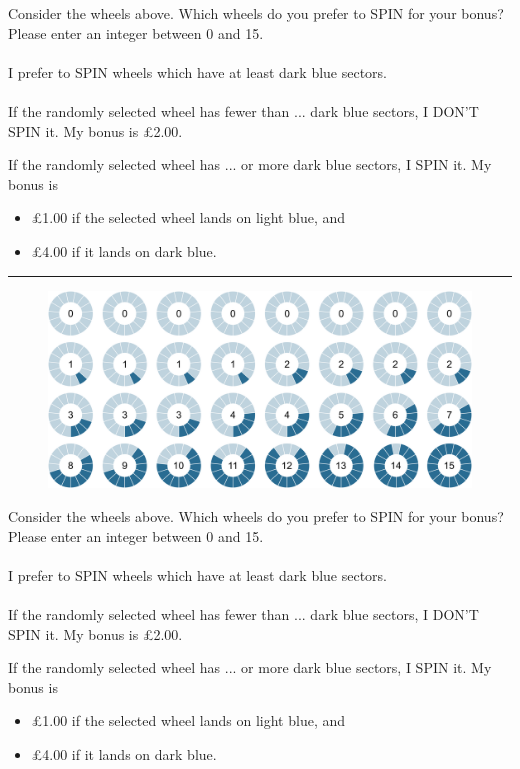 \noindent Consider the wheels above.
Which wheels do you prefer to SPIN for your bonus?\\
{\small Please enter an integer between 0 and 15.} \\
\\
\noindent I prefer to SPIN wheels which have at least \framebox[0.1\textwidth]{\rule{0pt}{15pt}} dark blue sectors.\\
\\
\noindent If the randomly selected wheel has fewer than ... dark blue sectors, I DON'T SPIN it.
My bonus is £2.00.

\noindent If the randomly selected wheel has ... or more dark blue sectors, I SPIN it.
My bonus is
\begin{itemize}
\item £1.00 if the selected wheel lands on light blue, and
\item £4.00 if it lands on dark blue.
\end{itemize}

\noindent \rule{\linewidth}{0.4pt}

\newpage
\begin{figure}[h!]
	\centering
	{\includegraphics[width=\linewidth]{Right_15.pdf}}
\end{figure}

\noindent Consider the wheels above.
Which wheels do you prefer to SPIN for your bonus?\\
{\small Please enter an integer between 0 and 15.} \\
\\
\noindent I prefer to SPIN wheels which have at least \framebox[0.1\textwidth]{\rule{0pt}{15pt}} dark blue sectors.\\
\\
\noindent If the randomly selected wheel has fewer than ... dark blue sectors, I DON'T SPIN it.
My bonus is £2.00.

\noindent If the randomly selected wheel has ... or more dark blue sectors, I SPIN it.
My bonus is
\begin{itemize}
\item £1.00 if the selected wheel lands on light blue, and
\item £4.00 if it lands on dark blue.
\end{itemize}

